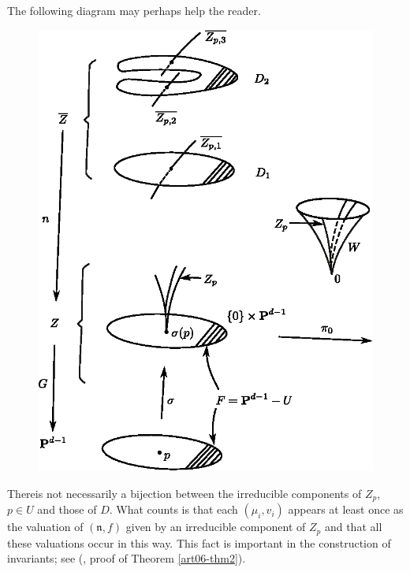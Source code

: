 \begin{note*}
The following diagram may perhaps help the reader.
\begin{figure}[H]
\centering 
\includegraphics[scale=.9]{fig06-1.eps}
\end{figure}\pageoriginale
\end{note*}

\begin{remark*}
There\pageoriginale is not necessarily a bijection between the irreducible components of $Z_p$, $p \in U$ and those of $D$. What counts is that each $(\mu_i, v_i)$ appears at least once as the valuation of $(\mathfrak{n}, f)$ given by an irreducible component of $Z_p$ and that all these valuations occur in this way. This fact is important in the construction of invariants; see (\cite{art06-keyT}, proof of Theorem \ref{art06-thm2}).
\end{remark*}

